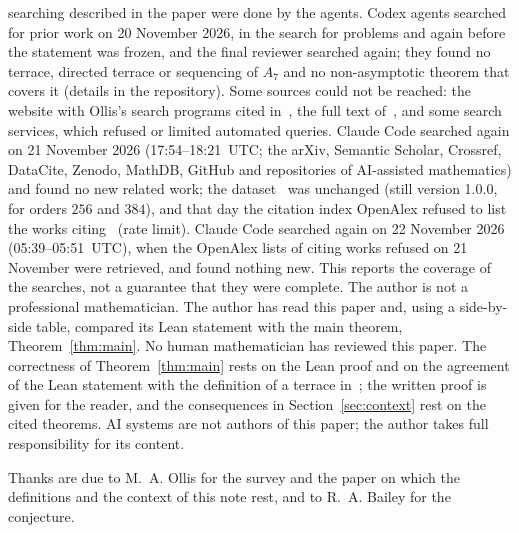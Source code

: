 \documentclass[11pt]{article}
\theoremstyle{definition}
\theoremstyle{remark}
\newcommand{\Alt}{A_7}
\begin{document}
searching described in the paper were done by the agents. Codex agents
searched for prior work on 20 November 2026, in the search for problems and
again before the statement was frozen, and the final reviewer searched again;
they found no terrace, directed terrace or sequencing of $\Alt$ and no
non-asymptotic theorem that covers it (details in the repository). Some
sources could not be reached: the website with Ollis's search programs cited
in~\cite[p.~3]{ollis16}, the full text of~\cite{ai93b}, and some search
services, which refused or limited automated queries. Claude Code searched again on 21 November 2026 (17:54--18:21~UTC; the arXiv, Semantic Scholar, Crossref, DataCite, Zenodo, MathDB, GitHub and repositories of AI-assisted mathematics) and found no new related work; the dataset~\cite{yang} was unchanged (still version 1.0.0, for orders $256$ and $384$), and that day the citation index OpenAlex refused to list the works citing~\cite{ollis16} (rate limit). Claude Code searched again on 22 November 2026 (05:39--05:51~UTC), when the OpenAlex lists of citing works refused on 21 November were retrieved, and found nothing new. This
reports the coverage of the searches, not a guarantee that they were complete.
The author is not a professional mathematician. The author has read this paper and, using a side-by-side table, compared its Lean statement with the main theorem, Theorem~\ref{thm:main}. No human
mathematician has reviewed this paper. The correctness of
Theorem~\ref{thm:main} rests on the Lean proof and on the agreement of the
Lean statement with the definition of a terrace in~\cite{ollis16,survey}; the
written proof is given for the reader, and the consequences in
Section~\ref{sec:context} rest on the cited theorems. AI systems are not
authors of this paper; the author takes full responsibility for its content.

\medskip
\noindent Thanks are due to M.~A. Ollis for the survey and the paper on
which the definitions and the context of this note rest, and to R.~A. Bailey
for the conjecture.
\end{document}

